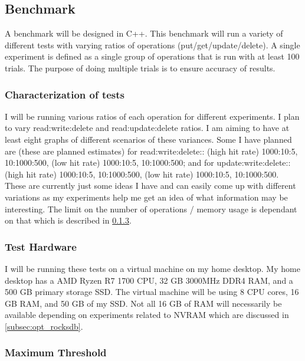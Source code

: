 \documentclass{article}
\begin{document}
\subsection{Benchmark}

A benchmark will be designed in C++. This benchmark will run a variety of
different tests with varying ratios of operations (put/get/update/delete). A
single experiment is defined as a single group of operations that is run with at
least 100 trials. The purpose of doing multiple trials is to ensure accuracy of
results.

\subsubsection{Characterization of tests}
\label{subsubsec:characterization_tests}

I will be running various ratios of each operation for different experiments. I
plan to vary read:write:delete and read:update:delete ratios. I am aiming to
have at least eight graphs of different scenarios of these variances. Some I
have planned are (these are planned estimates) for read:write:delete:: (high hit
rate) 1000:10:5, 10:1000:500, (low hit rate) 1000:10:5, 10:1000:500; and for
update:write:delete:: (high hit rate) 1000:10:5, 10:1000:500, (low hit rate)
1000:10:5, 10:1000:500. These are currently just some ideas I have and can
easily come up with different variations as my experiments help me get an idea
of what information may be interesting. The limit on the number of operations /
memory usage is dependant on that which is described in
\ref{subsubsec:max_threshold}.

\subsubsection{Test Hardware}
\label{subsubsec:test_hw}

I will be running these tests on a virtual machine on my home desktop. My home
desktop has a AMD Ryzen R7 1700 CPU, 32 GB 3000MHz DDR4 RAM, and a 500 GB
primary storage SSD. The virtual machine will be using 8 CPU cores, 16 GB RAM,
and 50 GB of my SSD. Not all 16 GB of RAM will necessarily be available
depending on experiments related to NVRAM which are discussed in
\ref{subsec:opt_rocksdb}.

\subsubsection{Maximum Threshold}
\label{subsubsec:max_threshold}
\end{document}
